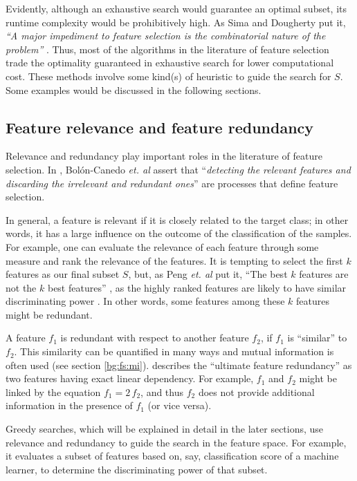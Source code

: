 \documentclass[12pt, twoside, a4paper]{report}
\begin{document}
Evidently, although an exhaustive search would guarantee an optimal subset, its runtime complexity would be prohibitively high. As Sima and Dougherty put it, \textit{``A major impediment to feature selection is the combinatorial nature of the problem''} \cite{RefWorks:191}. Thus, most of the algorithms in the literature of feature selection trade the optimality guaranteed in exhaustive search for lower computational cost. These methods involve some kind(s) of heuristic to guide the search for $S$. Some examples would be discussed in the following sections.

\subsection{Feature relevance and feature redundancy} \label{bg:fs:relevance}

Relevance and redundancy play important roles in the literature of feature selection. In \cite{RefWorks:163}, Bolón-Canedo \textit{et. al} assert that ``\textit{detecting the relevant features and discarding the irrelevant and redundant ones}'' are processes that define feature selection.

In general, a feature is relevant if it is closely related to the target class; in other words, it has a large influence on the outcome of the classification of the samples. For example, one can evaluate the relevance of each feature through some measure and rank the relevance of the features. It is tempting to select the first $k$ features as our final subset $S$, but, as Peng \textit{et. al} put it, ``The best $k$ features are not the $k$ best features'' \cite{RefWorks:182}, as the highly ranked features are likely to have similar discriminating power \cite{RefWorks:163}. In other words, some features among these $k$ features might be redundant.

A feature $f_1$ is redundant with respect to another feature $f_2$, if $f_1$ is ``similar'' to $f_2$. This similarity can be quantified in many ways and mutual information is often used (see section \ref{bg:fs:mi}). \cite{RefWorks:187} describes the ``ultimate feature redundancy'' as two features having exact linear dependency. For example, $f_1$ and $f_2$ might be linked by the equation $f_1 = 2 \, f_2$, and thus $f_2$ does not provide additional information in the presence of $f_1$ (or vice versa).

Greedy searches, which will be explained in detail in the later sections, use relevance and redundancy to guide the search in the feature space. For example, it evaluates a subset of features based on, say, classification score of a machine learner, to determine the discriminating power of that subset.
\end{document}
